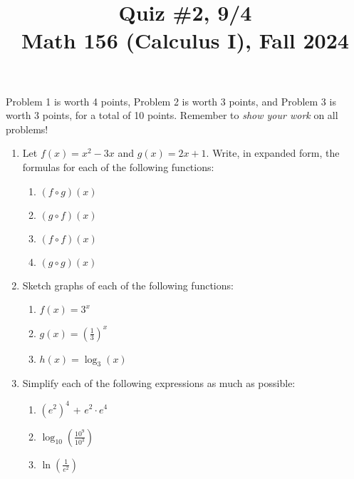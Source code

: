 \documentclass[11pt]{article}
\title{Quiz \#2, 9/4 \\ Math 156 (Calculus I), Fall 2024}
\date{}
\begin{document}
\maketitle

\thispagestyle{empty}

\vspace{-2cm}

Problem 1 is worth 4 points, Problem 2 is worth 3 points, and Problem 3 is worth 3 points, for a total of 10 points. Remember to \emph{show your work} on all problems!

\begin{enumerate}
\item Let $f(x) = x^2-3x$ and $g(x) = 2x+1$. Write, in expanded form, the formulas for each of the following functions:
\begin{multicols}{2}
\begin{enumerate}
\item $(f\circ g)(x)$
\item $(g\circ f)(x)$
\item $(f\circ f)(x)$
\item $(g\circ g)(x)$
\end{enumerate}
\end{multicols}

\vspace{4.5cm}

\item Sketch graphs of each of the following functions:
\begin{multicols}{3}
\begin{enumerate}
\item $f(x) = 3^x$
\item $g(x) = (\frac{1}{3})^x$
\item $h(x) = \log_3(x)$
\end{enumerate}
\end{multicols}

\vspace{5cm}

\item Simplify each of the following expressions as much as possible:
\begin{multicols}{3}
\begin{enumerate}
\item $(e^2)^4$ + $e^2 \cdot e^4$
\item $\log_{10}(\frac{10^9}{10^3})$
\item $\ln(\frac{1}{e^2})$
\end{enumerate}
\end{multicols}

\end{enumerate}
\end{document}

